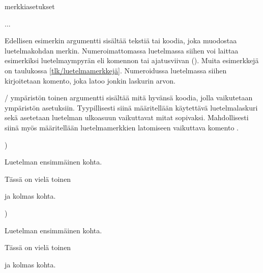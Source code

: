 \begin{koodilohkosis}
\begin{list}{merkki}{asetukset}
\item ...
\end{list}
\end{koodilohkosis}

\noindent
Edellisen esimerkin argumentti  sisältää tekstiä tai
koodia, joka muodostaa luetelmakohdan merkin. Numeroimattomassa
luetelmassa siihen voi laittaa esimerkiksi luetelmaympyrän eli komennon
 tai ajatusviivan (\koodi{--}). Muita esimerkkejä on
taulukossa \ref{tlk/luetelmamerkkejä}. Numeroidussa luetelmassa siihen
kirjoitetaan komento, joka latoo jonkin laskurin arvon.

\-/ ympäristön toinen argumentti 
sisältää mitä hyvänsä koodia, jolla vaikutetaan ympäristön asetuksiin.
Tyypillisesti siinä määritellään käytettävä luetelmalaskuri sekä
asetetaan luetelman ulkoasuun vaikuttavat mitat sopivaksi. Mahdollisesti
siinä myös määritellään luetelmamerkkien latomiseen vaikuttava komento
.

\begin{esimerkki*}

\begin{koodilohko}
\begin{list}{)}{
    \setlength{\leftmargin}{1.5em} %
    \setlength{\itemsep}{.2ex}     %
    \setlength{\parsep}{0ex}       %
  }
\item Luetelman ensimmäinen kohta.
\item Tässä on vielä toinen
\item ja kolmas kohta.
\end{list}
\end{koodilohko}
  \begin{tulos}
    \begin{list}{)}{
        \setlength{\leftmargin}{1.5em} %
        \setlength{\itemsep}{.2ex}     %
        \setlength{\parsep}{0ex}       %
      }
    \item Luetelman ensimmäinen kohta.
    \item Tässä on vielä toinen
    \item ja kolmas kohta.
    \end{list}
  \end{tulos}
  \caption{\-/ ympäristön argumenttien avulla vaikutetaan
    luetelmakohtien merkintätapaan ja mittoihin}
  \label{esim/list-perus}
\end{esimerkki*}

